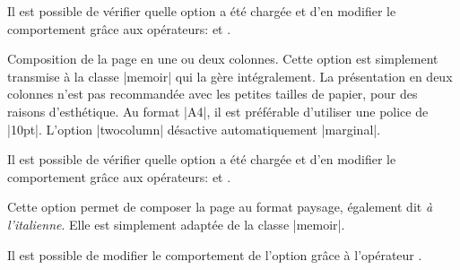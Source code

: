 \begin{developer}
Il est possible de vérifier quelle option a été chargée et d'en modifier le comportement grâce aux opérateurs:  et .
\end{developer}

\begin{noprint}
\end{noprint}

Composition de la page en une ou deux colonnes. Cette option est simplement transmise à la classe |memoir| qui la gère intégralement. La présentation en deux colonnes n'est pas recommandée avec les petites tailles de papier, pour des raisons d'esthétique. Au format |A4|, il est préférable d'utiliser une police de |10pt|. L'option |twocolumn| désactive automatiquement |marginal|.

\begin{developer}
Il est possible de vérifier quelle option a été chargée et d'en modifier le comportement grâce aux opérateurs:  et .
\end{developer}

Cette option permet de composer la page au format paysage, également dit \emph{à l'italienne}. Elle est simplement adaptée de la classe |memoir|.

\begin{developer}
Il est possible de modifier le comportement de l'option grâce à l'opérateur .
\end{developer}

\begin{noprint}
\end{noprint}

